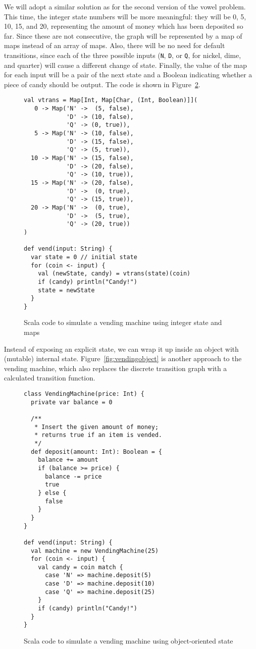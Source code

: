 We will adopt a similar solution as for the second version of the vowel problem. This
time, the integer state numbers will be more meaningful: they will be 0, 5, 10, 15,
and 20, representing the amount of money which has been deposited so far. Since these
are not consecutive, the graph will be represented by a map of maps instead of an
array of maps. Also, there will be no need for default transitions, since each of the
three possible inputs (\verb|N|, \verb|D|, or \verb|Q|, for nickel, dime, and quarter) will cause a
different change of state. Finally, the value of the map for each input will be a pair of the next state
and a Boolean indicating whether a piece of candy should be output. The code is shown in Figure~\ref{fig:vendinginteger}.
\begin{figure}
\begin{verbatim}
val vtrans = Map[Int, Map[Char, (Int, Boolean)]](
   0 -> Map('N' ->  (5, false),
            'D' -> (10, false),
            'Q' -> (0, true)),
   5 -> Map('N' -> (10, false),
            'D' -> (15, false),
            'Q' -> (5, true)),
  10 -> Map('N' -> (15, false),
            'D' -> (20, false),
            'Q' -> (10, true)),
  15 -> Map('N' -> (20, false),
            'D' ->  (0, true), 
            'Q' -> (15, true)),
  20 -> Map('N' ->  (0, true),
            'D' ->  (5, true),
            'Q' -> (20, true))
)

def vend(input: String) {
  var state = 0 // initial state
  for (coin <- input) {
    val (newState, candy) = vtrans(state)(coin)
    if (candy) println("Candy!")
    state = newState
  }
}
\end{verbatim}
\caption{Scala code to simulate a vending machine using integer state and maps}
\label{fig:vendinginteger}
\end{figure}

Instead of exposing an explicit state, we can wrap it up inside an object with
(mutable) internal state. Figure~\ref{fig:vendingobject} is another approach to the vending machine, which also
replaces the discrete transition graph with a calculated transition function.
\begin{figure}
\begin{verbatim}
class VendingMachine(price: Int) {
  private var balance = 0
  
  /**
   * Insert the given amount of money;
   * returns true if an item is vended.
   */
  def deposit(amount: Int): Boolean = {
    balance += amount
    if (balance >= price) {
      balance -= price
      true
    } else {
      false
    }
  }
}

def vend(input: String) {
  val machine = new VendingMachine(25)
  for (coin <- input) {
    val candy = coin match {
      case 'N' => machine.deposit(5)
      case 'D' => machine.deposit(10)
      case 'Q' => machine.deposit(25)
    }
    if (candy) println("Candy!")
  }
}
\end{verbatim}
\caption{Scala code to simulate a vending machine using object-oriented state}
\label{fig:vendinginteger}
\end{figure}
